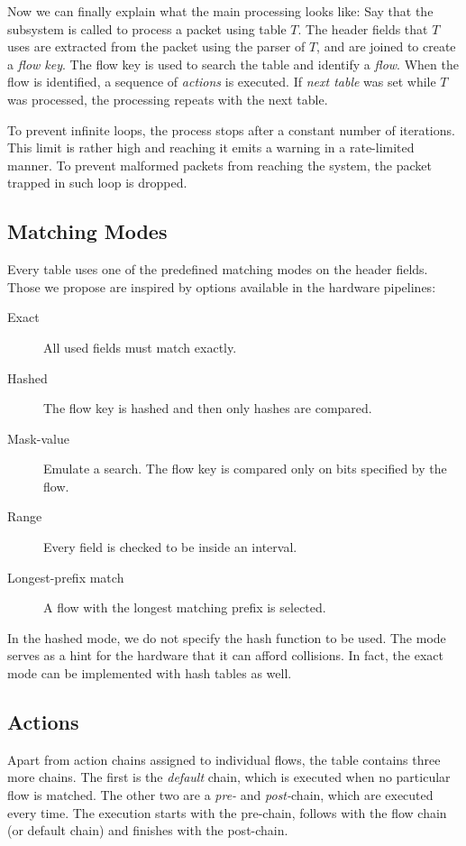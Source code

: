 Now we can finally explain what the main processing looks like: Say that
the subsystem is called to process a packet using table $T$. The header fields
that $T$ uses are extracted from the packet using the parser of $T$, and are
joined to create a \emph{flow key}. The flow key is used to search the table
and identify a \emph{flow}. When the flow is identified, a sequence of
\emph{actions} is executed. If \emph{next table} was set while $T$ was processed,
the processing repeats with the next table.

To prevent infinite loops, the process stops after a constant number of
iterations. This limit is rather high and reaching it emits a warning in
a rate-limited manner. To prevent malformed packets from reaching the system,
the packet trapped in such loop is dropped.

\subsection{Matching Modes}

Every table uses one of the predefined matching modes on the header fields. Those we
propose are inspired by options available in the hardware pipelines:

\begin{description}
\item[Exact] All used fields must match exactly.
\item[Hashed] The flow key is hashed and then only hashes are compared.
\item[Mask-value] Emulate a  search. The flow key is compared only on
bits specified by the flow.
\item[Range] Every field is checked to be inside an interval.
\item[Longest-prefix match] A flow with the longest matching prefix is selected.
\end{description}

In the hashed mode, we do not specify the hash function to be used. The mode
serves as a hint for the hardware that it can afford collisions. In fact, the exact
mode can be implemented with hash tables as well.

\subsection{Actions}

Apart from action chains assigned to individual flows, the table contains three
more chains. The first is the \emph{default} chain, which is executed when no
particular flow is matched. The other two are a \emph{pre-} and
\emph{post-}chain, which are executed every time. The execution starts with the
pre-chain, follows with the flow chain (or default chain) and finishes with
the post-chain.

